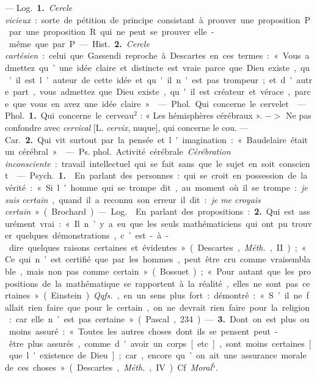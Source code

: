 \begin{itemize}[leftmargin=1cm, label=, itemsep=11pt]
 — \si{Log.} {\bf 1.} {\it Cercle vicieux} : sorte
de pétition de principe consistant
à prouver une proposition P par
une proposition R qui ne peut se
prouver elle-même que par P.

— \si{Hist.} {\bf 2.} {\it Cercle cartésien} : celui
que Gassendi reproche à Descartes
en ces termes : « Vous admettez
qu’une idée claire et distincte est
vraie parce que Dieu existe, qu'il
est l’auteur de cette idée et qu'il
n'est pas trompeur; et d'autre part,
vous admettez que Dieu existe, qu'il
est créateur et vérace, parce que
vous en avez une idée claire. »

 — \si{Phol.} Qui concerne
le cervelet.

 — \si{Phol.} {\bf 1.} Qui concerne le
cerveau$^2$ : « Les hémisphères cérébraux ». $->$ Ne pas confondre avec
{\it cervical} [L. {\it cervix}, nuque], qui concerne le cou. — \si{Car.} {\bf 2.} Qui vit surtout par la pensée et l'imagination :
« Baudelaire était un cérébral. »

 — \si{Ps. phol.} Activité
cérébrale. {\it Cérébration inconsciente} :
travail intellectuel qui se fait sans
que le sujet en soit conscient.

 — \si{Psych.} {\bf 1.}  En parlant des
personnes : qui se croit en possession de la vérité : « Si l'homme qui se
trompe dit, au moment où il se
trompe : {\it je suis certain}, quand il a
reconnu son erreur il dit : {\it je me
croyais certain} » (Brochard).

— \si{Log.}  En parlant des propositions : {\bf 2.} Qui est assurément vrai:
« Il n’y a eu que les seuls mathématiciens qui ont pu trouver quelques
démonstrations, c’est-à-dire quelques
raisons certaines et évidentes »
(Descartes, {\it Méth.}, II); « Ce qui n’est
certifié que par les hommes, peut
être cru comme vraisemblable, mais
non pas comme certain » (Bossuet);
« Pour autant que les propositions
de la mathématique se rapportent
à la réalité, elles ne sont pas certaines » (Einstein). {\it Qqfs.}, en un sens
plus fort : démontré : « S’il ne fallait
rien faire que pour le certain, on ne
devrait rien faire pour la religion:
car elle n’est pas certaine » (Pascal,
234). — {\bf 3.} Dont on est plus ou
moins assuré : « Toutes les autres
choses dont ils se pensent peut-être
plus assurés, comme d'avoir un
corps [etc.], sont moins certaines
[que l'existence de Dieu]; car, encore
qu’on ait une assurance morale de
ces choses... » (Descartes, {\it Méth.}, IV).
Cf. {\it Moral}$^5$.


\end{itemize}
